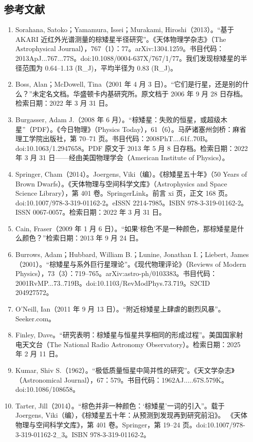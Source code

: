 \subsection{参考文献}
\begin{enumerate}
\item Sorahana, Satoko；Yamamura, Issei；Murakami, Hiroshi（2013）。“基于 AKARI 近红外光谱测量的棕矮星半径研究”。《天体物理学杂志》（The Astrophysical Journal），767（1）：77。arXiv:1304.1259。书目代码：2013ApJ...767...77S。doi:10.1088/0004-637X/767/1/77。我们发现棕矮星的半径范围为 0.64–1.13 (R_J)，平均半径为 0.83 (R_J)。
\item Boss, Alan；McDowell, Tina（2001 年 4 月 3 日）。“它们是行星，还是别的什么？”未定名文档。华盛顿卡内基研究所。原文档于 2006 年 9 月 28 日存档。检索日期：2022 年 3 月 31 日。
\item Burgasser, Adam J.（2008 年 6 月）。“棕矮星：失败的恒星，或超级木星”（PDF）。《今日物理》（Physics Today），61（6）。马萨诸塞州剑桥：麻省理工学院出版社，第 70–71 页。书目代码：2008PhT....61f..70B。doi:10.1063/1.2947658。PDF 原文于 2013 年 5 月 8 日存档。检索日期：2022 年 3 月 31 日——经由美国物理学会（American Institute of Physics）。
\item Springer, Cham（2014）。Joergens, Viki（编）。《棕矮星五十年》（50 Years of Brown Dwarfs）。《天体物理与空间科学文库》（Astrophysics and Space Science Library），第 401 卷。SpringerLink。前言 xi 页，正文 168 页。doi:10.1007/978-3-319-01162-2。eISSN 2214-7985。ISBN 978-3-319-01162-2。ISSN 0067-0057。检索日期：2022 年 3 月 31 日。
\item Cain, Fraser（2009 年 1 月 6 日）。“如果‘棕色’不是一种颜色，那棕矮星是什么颜色？”检索日期：2013 年 9 月 24 日。
\item Burrows, Adam；Hubbard, William B.；Lunine, Jonathan I.；Liebert, James（2001）。“棕矮星与系外巨行星理论”。《现代物理评论》（Reviews of Modern Physics），73（3）：719–765。arXiv:astro-ph/0103383。书目代码：2001RvMP...73..719B。doi:10.1103/RevModPhys.73.719。S2CID 204927572。
\item O’Neill, Ian（2011 年 9 月 13 日）。“附近棕矮星上肆虐的剧烈风暴”。Seeker.com。
\item Finley, Dave。“研究表明：棕矮星与恒星共享相同的形成过程”。美国国家射电天文台（The National Radio Astronomy Observatory）。检索日期：2025 年 2 月 11 日。
\item Kumar, Shiv S.（1962）。“极低质量恒星中简并性的研究”。《天文学杂志》（Astronomical Journal），67：579。书目代码：1962AJ.....67S.579K。doi:10.1086/108658。
\item Tarter, Jill（2014）。“棕色并非一种颜色：‘棕矮星’一词的引入”。载于 Joergens, Viki（编），《棕矮星五十年：从预测到发现再到研究前沿》。 《天体物理与空间科学文库》，第 401 卷。Springer，第 19–24 页。doi:10.1007/978-3-319-01162-2_3。ISBN 978-3-319-01162-2。

\end{enumerate}
